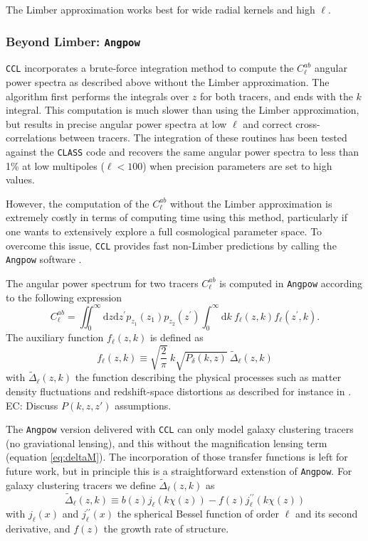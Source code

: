 \documentclass[\docopts]{\docclass}
\newcommand{\elisa}[1]{\textcolor{green!10!orange!90!}{EC: #1}}
\newcommand{\ccl}{{\tt CCL}\xspace}
\newcommand{\class}{{\tt CLASS}\xspace}
\begin{document}
The Limber approximation works best for wide radial kernels and high $\ell$.

\subsubsection{Beyond Limber: \texttt{Angpow}}
\label{sec:angpow}

\ccl incorporates a brute-force integration method to compute the $C^{ab}_\ell$ angular power spectra as described above without the Limber approximation. The algorithm first performs the integrals over $z$ for both tracers, and ends with the $k$ integral. This computation is much slower than using the Limber approximation, but results in precise angular power spectra at low $\ell$ and correct cross-correlations between tracers. The integration of these routines has been tested against the \class code and recovers the same angular power spectra to less than 1\% at low multipoles ($\ell<100$) when precision parameters are set to high values.

However, the computation of the $C^{ab}_\ell$ without the Limber approximation is extremely costly in terms of computing time using this method, particularly if one wants to extensively explore a full cosmological parameter space. To overcome this issue, \ccl provides fast non-Limber predictions by calling the \texttt{Angpow} software \citep{2017A&A...602A..72C}. 

The angular power spectrum for two tracers $C_{\ell}^{ab}$ is computed in \texttt{Angpow} according to the following expression
\begin{equation}
  C_{\ell}^{ab} = \iint_0^\infty \mathrm{d} z \mathrm{d} z^\prime  p_{z_1}(z_1) p_{z_2}(z^\prime) \int_0^\infty \mathrm{d} k\ f_{\ell}(z, k) f_{\ell}(z^\prime, k).
  \label{eq-clz1z2-obs}
\end{equation}
The auxiliary function $f_\ell(z,k)$ is defined as
\begin{equation}
f_\ell(z,k) \equiv  \sqrt{\frac{2}{\pi}}\  k \sqrt{P_\delta(k,z)}\ \widetilde{\Delta}_\ell(z,k)\label{eq-fell-func}
\end{equation}
with $\widetilde{\Delta}_\ell(z,k)$ the function describing the physical processes such as matter density fluctuations and redshift-space distortions as described for instance in \citet{2008cmb..book.....D,2009PhRvD..80h3514Y,2010PhRvD..82h3508Y, 2011PhRvD..84d3516C,2011PhRvD..84f3505B}.  \elisa{Discuss $P(k,z,z')$ assumptions.}

The \texttt{Angpow} version delivered with \ccl can only model galaxy clustering tracers (no graviational lensing), and this without the magnification lensing term (equation \ref{eq:deltaM}). The incorporation of those transfer functions is left for future work, but in principle this is a straightforward extenstion of \texttt{Angpow}. For galaxy clustering tracers we define $\widetilde{\Delta}_\ell(z,k)$ as 
\begin{equation}
 \widetilde{\Delta}_\ell(z,k) \equiv b(z) j_\ell(k \chi(z)) - f(z) j_\ell^{\prime\prime}(k \chi(z)) 
\end{equation}
with $j_\ell(x)$ and $j_\ell^{\prime\prime}(x)$ the spherical Bessel function of order $\ell$ and its second derivative, and $f(z)$ the growth rate of structure.
\end{document}
